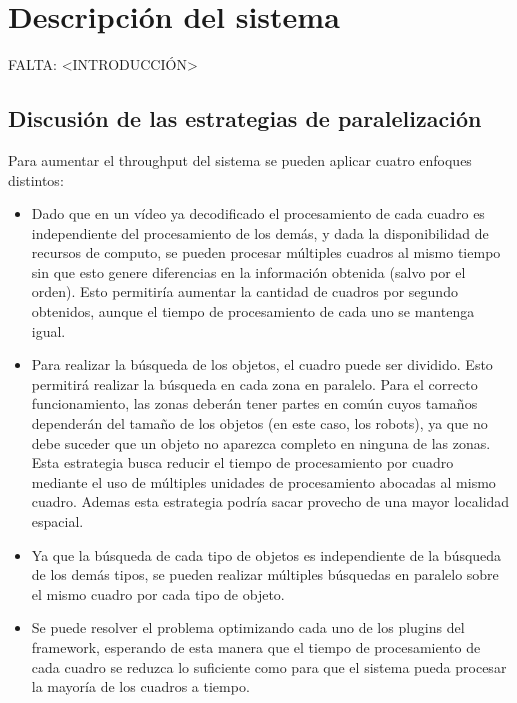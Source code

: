 
\section{Descripción del sistema}

\label{descripcionSistema}

FALTA: <INTRODUCCIÓN>

\subsection{Discusión de las estrategias de paralelización}

Para aumentar el throughput del sistema se pueden aplicar cuatro enfoques distintos:

\begin{itemize}

	\item	Dado que en un vídeo ya decodificado el procesamiento de cada
		cuadro es independiente del procesamiento de los demás, y dada
		la disponibilidad de recursos de computo, se pueden procesar
		múltiples cuadros al mismo tiempo sin que esto genere
		diferencias en la información obtenida (salvo por el orden).
		Esto permitiría aumentar la cantidad de cuadros por segundo
		obtenidos, aunque el tiempo de procesamiento de cada uno se
		mantenga igual.

	\item	Para realizar la búsqueda de los objetos, el cuadro puede ser
		dividido. Esto permitirá realizar la búsqueda en cada zona en
		paralelo. Para el correcto funcionamiento, las zonas deberán
		tener partes en común cuyos tamaños dependerán del tamaño de los
		objetos (en este caso, los robots), ya que no debe suceder que
		un objeto no aparezca completo en ninguna de las zonas. Esta
		estrategia busca reducir el tiempo de procesamiento por cuadro
		mediante el uso de múltiples unidades de procesamiento abocadas
		al mismo cuadro. Ademas esta estrategia podría sacar provecho de
		una mayor localidad espacial.

	\item	Ya que la búsqueda de cada tipo de objetos es independiente de
		la búsqueda de los demás tipos, se pueden realizar múltiples
		búsquedas en paralelo sobre el mismo cuadro por cada tipo de
		objeto.

	\item	Se puede resolver el problema optimizando cada uno de los
		plugins del framework, esperando de esta manera que el tiempo de
		procesamiento de cada cuadro se reduzca lo suficiente como para
		que el sistema pueda procesar la mayoría de los cuadros a
		tiempo.

\end{itemize}

